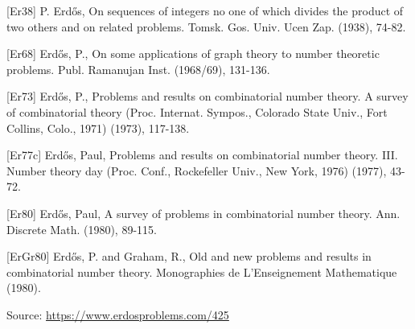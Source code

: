 \documentclass{article}
\begin{document}
[Er38] P. Erd\H{o}s, On sequences of integers no one of which divides the product of two others and on related problems. Tomsk. Gos. Univ. Ucen Zap. (1938), 74-82.
 
 [Er68] Erd\H{o}s, P., On some applications of graph theory to number theoretic problems. Publ. Ramanujan Inst. (1968/69), 131-136.
 
 [Er73] Erd\H{o}s, P., Problems and results on combinatorial number theory. A survey of combinatorial theory (Proc. Internat. Sympos., Colorado State Univ., Fort Collins, Colo., 1971) (1973), 117-138.
 
 [Er77c] Erd\H{o}s, Paul, Problems and results on combinatorial number theory. III. Number theory day (Proc. Conf., Rockefeller Univ.,
New York, 1976) (1977), 43-72.
 
 [Er80] Erd\H{o}s, Paul, A survey of problems in combinatorial number theory. Ann. Discrete Math. (1980), 89-115.
 
 [ErGr80] Erd\H{o}s, P. and Graham, R., Old and new problems and results in combinatorial number theory. Monographies de L'Enseignement Mathematique (1980).

\bigskip
\noindent\small{Source: \url{https://www.erdosproblems.com/425}}
\end{document}
